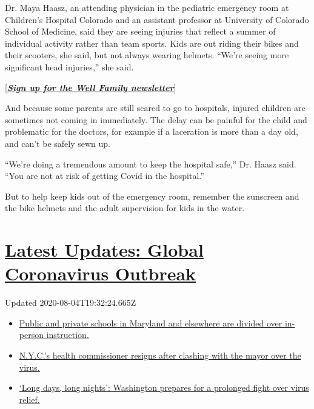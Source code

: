 Dr. Maya Haasz, an attending physician in the pediatric emergency room
at Children's Hospital Colorado and an assistant professor at University
of Colorado School of Medicine, said they are seeing injuries that
reflect a summer of individual activity rather than team sports. Kids
are out riding their bikes and their scooters, she said, but not always
wearing helmets. ``We're seeing more significant head injuries,'' she
said.

{[}\textbf{\href{https://www.nytimes.com/newsletters/well-family}{\emph{Sign
up for the Well Family newsletter}}}{]}

And because some parents are still scared to go to hospitals, injured
children are sometimes not coming in immediately. The delay can be
painful for the child and problematic for the doctors, for example if a
laceration is more than a day old, and can't be safely sewn up.

``We're doing a tremendous amount to keep the hospital safe,'' Dr. Haasz
said. ``You are not at risk of getting Covid in the hospital.''

But to help keep kids out of the emergency room, remember the sunscreen
and the bike helmets and the adult supervision for kids in the water.

\hypertarget{latest-updates-global-coronavirus-outbreak}{%
\section{\texorpdfstring{\href{https://www.nytimes.com/2020/08/04/world/coronavirus-cases.html?action=click\&pgtype=Article\&state=default\&region=MAIN_CONTENT_1\&context=storylines_live_updates}{Latest
Updates: Global Coronavirus
Outbreak}}{Latest Updates: Global Coronavirus Outbreak}}\label{latest-updates-global-coronavirus-outbreak}}

Updated 2020-08-04T19:32:24.665Z

\begin{itemize}
\tightlist
\item
  \href{https://www.nytimes.com/2020/08/04/world/coronavirus-cases.html?action=click\&pgtype=Article\&state=default\&region=MAIN_CONTENT_1\&context=storylines_live_updates\#link-4825b93}{Public
  and private schools in Maryland and elsewhere are divided over
  in-person instruction.}
\item
  \href{https://www.nytimes.com/2020/08/04/world/coronavirus-cases.html?action=click\&pgtype=Article\&state=default\&region=MAIN_CONTENT_1\&context=storylines_live_updates\#link-4d1eafa8}{N.Y.C.'s
  health commissioner resigns after clashing with the mayor over the
  virus.}
\item
  \href{https://www.nytimes.com/2020/08/04/world/coronavirus-cases.html?action=click\&pgtype=Article\&state=default\&region=MAIN_CONTENT_1\&context=storylines_live_updates\#link-6b644638}{`Long
  days, long nights': Washington prepares for a prolonged fight over
  virus relief.}
\end{itemize}

